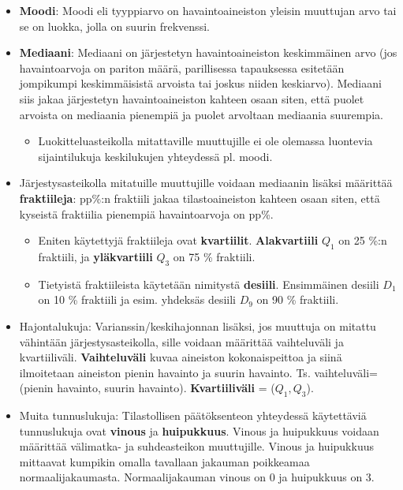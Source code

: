 \documentclass[
]{book}
\providecommand{\tightlist}{%
  \setlength{\itemsep}{0pt}\setlength{\parskip}{0pt}}
\begin{document}
\begin{itemize}
\item
  \textbf{Moodi}: Moodi eli tyyppiarvo on havaintoaineiston yleisin muuttujan arvo tai se on luokka, jolla on suurin frekvenssi.
\item
  \textbf{Mediaani}: Mediaani on järjestetyn havaintoaineiston keskimmäinen arvo (jos havaintoarvoja on pariton määrä, parillisessa tapauksessa esitetään jompikumpi keskimmäisistä arvoista tai joskus niiden keskiarvo). Mediaani siis jakaa järjestetyn havaintoaineiston kahteen osaan siten, että puolet arvoista on mediaania pienempiä ja puolet arvoltaan mediaania suurempia.

  \begin{itemize}
  \tightlist
  \item
    Luokitteluasteikolla mitattaville muuttujille ei ole olemassa luontevia sijaintilukuja keskilukujen yhteydessä pl. moodi.
  \end{itemize}
\item
  Järjestysasteikolla mitatuille muuttujille voidaan mediaanin lisäksi määrittää \textbf{fraktiileja}: pp\%:n fraktiili jakaa tilastoaineiston kahteen osaan siten, että kyseistä fraktiilia pienempiä havaintoarvoja on pp\%.

  \begin{itemize}
  \tightlist
  \item
    Eniten käytettyjä fraktiileja ovat \textbf{kvartiilit}. \textbf{Alakvartiili} \(Q_1\) on 25 \%:n fraktiili, ja \textbf{yläkvartiili} \(Q_3\) on 75 \% fraktiili.
  \item
    Tietyistä fraktiileista käytetään nimitystä \textbf{desiili}. Ensimmäinen desiili \(D_1\) on 10 \% fraktiili ja esim. yhdeksäs desiili \(D_9\) on 90 \% fraktiili.
  \end{itemize}
\item
  Hajontalukuja: Varianssin/keskihajonnan lisäksi, jos muuttuja on mitattu vähintään järjestysasteikolla, sille voidaan määrittää vaihteluväli ja kvartiiliväli. \textbf{Vaihteluväli} kuvaa aineiston kokonaispeittoa ja siinä ilmoitetaan aineiston pienin havainto ja suurin havainto. Ts. vaihteluväli=(pienin havainto, suurin havainto). \textbf{Kvartiiliväli} = (\(Q_1, Q_3\)).
\item
  Muita tunnuslukuja: Tilastollisen päätöksenteon yhteydessä käytettäviä tunnuslukuja ovat \textbf{vinous} ja \textbf{huipukkuus}. Vinous ja huipukkuus voidaan määrittää välimatka- ja suhdeasteikon muuttujille. Vinous ja huipukkuus mittaavat kumpikin omalla tavallaan jakauman poikkeamaa normaalijakaumasta. Normaalijakauman vinous on 0 ja huipukkuus on 3.
\end{itemize}
\end{document}
